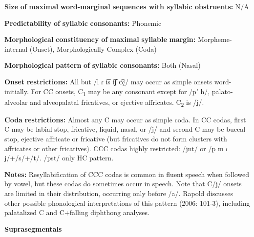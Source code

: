 \documentclass[output=paper]{langsci/langscibook}
\begin{document}
\begin{styleBody}
\textbf{Size} \textbf{of} \textbf{maximal} \textbf{word{}-marginal sequences with syllabic obstruents:} N/A
\end{styleBody}

\begin{styleBody}
\textbf{Predictability} \textbf{of} \textbf{syllabic} \textbf{consonants:} Phonemic
\end{styleBody}

\begin{styleBody}
\textbf{Morphological} \textbf{constituency} \textbf{of} \textbf{maximal} \textbf{syllable} \textbf{margin:} Morpheme-internal (Onset), Morphologically Complex (Coda)
\end{styleBody}

\begin{styleBody}
\textbf{Morphological} \textbf{pattern} \textbf{of} \textbf{syllabic} \textbf{consonants:} Both (Nasal)
\end{styleBody}

\begin{styleBody}
\textbf{Onset} \textbf{restrictions:} All but /l ɾ t͡s t͡ʃ c͡ç/ may occur as simple onsets word-initially. For CC onsets, C\textsubscript{1} may be any consonant except for /p’ h/, palato-alveolar and alveopalatal fricatives, or ejective affricates. C\textsubscript{2} is /j/.
\end{styleBody}

\begin{styleBody}
\textbf{Coda} \textbf{restrictions:} Almost any C may occur as simple coda. In CC codas, first C may be labial stop, fricative, liquid, nasal, or /j/ and second C may be buccal stop, ejective affricate or fricative (but fricatives do not form clusters with affricates or other fricatives). CCC codas highly restricted: /jnt/ or /p m ɾ j/+/s/+/t/. /pst/ only HC pattern.
\end{styleBody}

\begin{styleBody}
\textbf{Notes:} Resyllabification of CCC codas is common in fluent speech when followed by vowel, but these codas do sometimes occur in speech. Note that C/j/ onsets are limited in their distribution, occurring only before /a/. Rapold discusses other possible phonological interpretations of this pattern (2006: 101-3), including palatalized C and C+falling diphthong analyses.
\end{styleBody}

\begin{styleBody}
\textbf{Suprasegmentals}
\end{styleBody}
\end{document}
